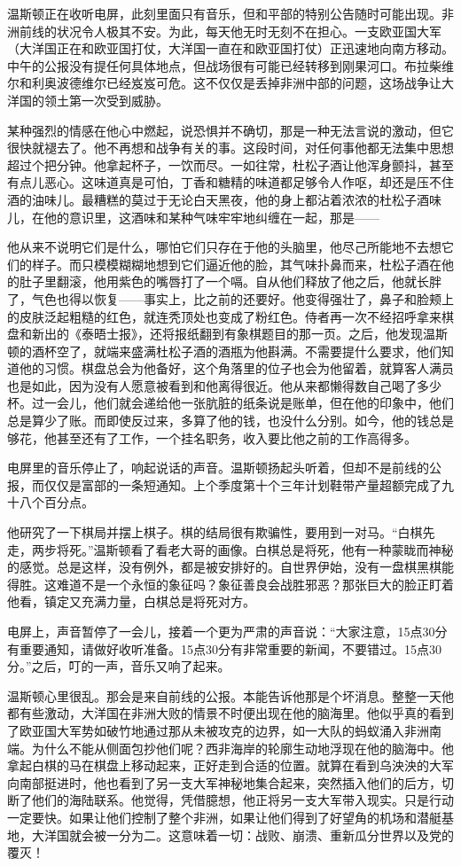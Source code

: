 温斯顿正在收听电屏，此刻里面只有音乐，但和平部的特别公告随时可能出现。非洲前线的状况令人极其不安。为此，每天他无时无刻不在担心。一支欧亚国大军（大洋国正在和欧亚国打仗，大洋国一直在和欧亚国打仗）正迅速地向南方移动。中午的公报没有提任何具体地点，但战场很有可能已经转移到刚果河口。布拉柴维尔和利奥波德维尔已经岌岌可危。这不仅仅是丢掉非洲中部的问题，这场战争让大洋国的领土第一次受到威胁。

某种强烈的情感在他心中燃起，说恐惧并不确切，那是一种无法言说的激动，但它很快就褪去了。他不再想和战争有关的事。这段时间，对任何事他都无法集中思想超过个把分钟。他拿起杯子，一饮而尽。一如往常，杜松子酒让他浑身颤抖，甚至有点儿恶心。这味道真是可怕，丁香和糖精的味道都足够令人作呕，却还是压不住酒的油味儿。最糟糕的莫过于无论白天黑夜，他的身上都沾着浓浓的杜松子酒味儿，在他的意识里，这酒味和某种气味牢牢地纠缠在一起，那是——

他从来不说明它们是什么，哪怕它们只存在于他的头脑里，他尽己所能地不去想它们的样子。而只模模糊糊地想到它们逼近他的脸，其气味扑鼻而来，杜松子酒在他的肚子里翻滚，他用紫色的嘴唇打了一个嗝。自从他们释放了他之后，他就长胖了，气色也得以恢复——事实上，比之前的还要好。他变得强壮了，鼻子和脸颊上的皮肤泛起粗糙的红色，就连秃顶处也变成了粉红色。侍者再一次不经招呼拿来棋盘和新出的《泰晤士报》，还将报纸翻到有象棋题目的那一页。之后，他发现温斯顿的酒杯空了，就端来盛满杜松子酒的酒瓶为他斟满。不需要提什么要求，他们知道他的习惯。棋盘总会为他备好，这个角落里的位子也会为他留着，就算客人满员也是如此，因为没有人愿意被看到和他离得很近。他从来都懒得数自己喝了多少杯。过一会儿，他们就会递给他一张肮脏的纸条说是账单，但在他的印象中，他们总是算少了账。而即使反过来，多算了他的钱，也没什么分别。如今，他的钱总是够花，他甚至还有了工作，一个挂名职务，收入要比他之前的工作高得多。

电屏里的音乐停止了，响起说话的声音。温斯顿扬起头听着，但却不是前线的公报，而仅仅是富部的一条短通知。上个季度第十个三年计划鞋带产量超额完成了九十八个百分点。

他研究了一下棋局并摆上棋子。棋的结局很有欺骗性，要用到一对马。``白棋先走，两步将死。''温斯顿看了看老大哥的画像。白棋总是将死，他有一种蒙眬而神秘的感觉。总是这样，没有例外，都是被安排好的。自世界伊始，没有一盘棋黑棋能得胜。这难道不是一个永恒的象征吗？象征善良会战胜邪恶？那张巨大的脸正盯着他看，镇定又充满力量，白棋总是将死对方。

电屏上，声音暂停了一会儿，接着一个更为严肃的声音说：``大家注意，15点30分有重要通知，请做好收听准备。15点30分有非常重要的新闻，不要错过。15点30分。''之后，叮的一声，音乐又响了起来。

温斯顿心里很乱。那会是来自前线的公报。本能告诉他那是个坏消息。整整一天他都有些激动，大洋国在非洲大败的情景不时便出现在他的脑海里。他似乎真的看到了欧亚国大军势如破竹地通过那从未被攻克的边界，如一大队的蚂蚁涌入非洲南端。为什么不能从侧面包抄他们呢？西非海岸的轮廓生动地浮现在他的脑海中。他拿起白棋的马在棋盘上移动起来，正好走到合适的位置。就算在看到乌泱泱的大军向南部挺进时，他也看到了另一支大军神秘地集合起来，突然插入他们的后方，切断了他们的海陆联系。他觉得，凭借臆想，他正将另一支大军带入现实。只是行动一定要快。如果让他们控制了整个非洲，如果让他们得到了好望角的机场和潜艇基地，大洋国就会被一分为二。这意味着一切：战败、崩溃、重新瓜分世界以及党的覆灭！

